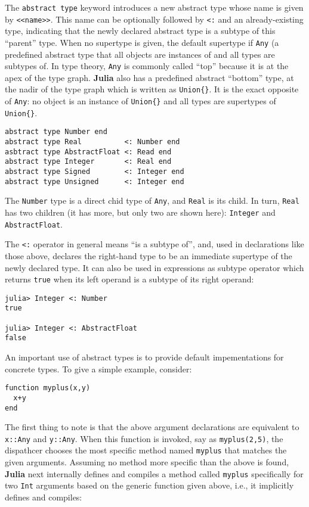 \documentclass[
]{article}
\begin{document}
The \texttt{abstract\ type} keyword introduces a new abstract type whose
name is given by
\texttt{\textless{}\textless{}name\textgreater{}\textgreater{}}. This
name can be optionally followed by \texttt{\textless{}:} and an
already-existing type, indicating that the newly declared abstract type
is a subtype of this ``parent'' type. When no supertype is given, the
default supertype if \texttt{Any} (a predefined abstract type that all
objects are instances of and all types are subtypes of. In type theory,
\texttt{Any} is commonly called ``top'' because it is at the apex of the
type graph. \textbf{Julia} also has a predefined abstract ``bottom''
type, at the nadir of the type graph which is written as
\texttt{Union\{\}}. It is the exact opposite of \texttt{Any}: no object
is an instance of \texttt{Union\{\}} and all types are supertypes of
\texttt{Union\{\}}.

\begin{verbatim}
abstract type Number end
abstract type Real          <: Number end
asbtract type AbstractFloat <: Read end
abstract type Integer       <: Real end
abstract type Signed        <: Integer end
abstract type Unsigned      <: Integer end
\end{verbatim}

The \texttt{Number} type is a direct chid type of \texttt{Any}, and
\texttt{Real} is its child. In turn, \texttt{Real} has two children (it
has more, but only two are shown here): \texttt{Integer} and
\texttt{AbstractFloat}.

The \texttt{\textless{}:} operator in general means ``is a subtype of'',
and, used in declarations like those above, declares the right-hand type
to be an immediate supertype of the newly declared type. It can also be
used in expressions as subtype operator which returns \texttt{true} when
its left operand is a subtype of its right operand:

\begin{verbatim}
julia> Integer <: Number
true

julia> Integer <: AbstractFloat
false
\end{verbatim}

An important use of abstract types is to provide default impementations
for concrete types. To give a simple example, consider:

\begin{verbatim}
function myplus(x,y)
  x+y
end
\end{verbatim}

The first thing to note is that the above argument declarations are
equivalent to \texttt{x::Any} and \texttt{y::Any}. When this function is
invoked, say as \texttt{myplus(2,5)}, the dispathcer chooses the most
specific method named \texttt{myplus} that matches the given arguments.
Assuming no method more specific than the above is found, \textbf{Julia}
next internally defines and compiles a method called \texttt{myplus}
specifically for two \texttt{Int} arguments based on the generic
function given above, i.e., it implicitly defines and compiles:
\end{document}
